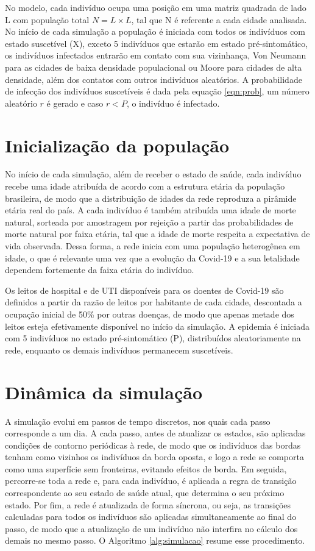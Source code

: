 \documentclass[
	12pt,				%
	openright,			%
	oneside,			%
	a4paper,			%
	english,			%
	french,				%
	spanish,			%
	brazil				%
	]{abntex2}
\begin{document}
No modelo, cada indivíduo ocupa uma posição em uma matriz quadrada de lado L com população total $N = L \times L$, tal que N é referente a cada cidade analisada. No início de cada simulação a população é iniciada com todos os indivíduos com estado suscetível (X), exceto 5 indivíduos que estarão em estado pré-sintomático, os indivíduos infectados entrarão em contato com sua vizinhança, Von Neumann para as cidades de baixa densidade populacional ou Moore para cidades de alta densidade, além dos contatos com outros indivíduos aleatórios. A probabilidade de infecção dos indivíduos suscetíveis é dada pela equação \ref{eqn:prob}, um número aleatório $r$ é gerado e caso $r < P$, o indivíduo é infectado.

\section{Inicialização da população}

No início de cada simulação, além de receber o estado de saúde, cada indivíduo recebe uma idade atribuída de acordo com a estrutura etária da população brasileira, de modo que a distribuição de idades da rede reproduza a pirâmide etária real do país. A cada indivíduo é também atribuída uma idade de morte natural, sorteada por amostragem por rejeição a partir das probabilidades de morte natural por faixa etária, tal que a idade de morte respeita a expectativa de vida observada. Dessa forma, a rede inicia com uma população heterogênea em idade, o que é relevante uma vez que a evolução da Covid-19 e a sua letalidade dependem fortemente da faixa etária do indivíduo.

Os leitos de hospital e de UTI disponíveis para os doentes de Covid-19 são definidos a partir da razão de leitos por habitante de cada cidade, descontada a ocupação inicial de 50\% por outras doenças, de modo que apenas metade dos leitos esteja efetivamente disponível no início da simulação. A epidemia é iniciada com 5 indivíduos no estado pré-sintomático (P), distribuídos aleatoriamente na rede, enquanto os demais indivíduos permanecem suscetíveis.

\section{Dinâmica da simulação}

A simulação evolui em passos de tempo discretos, nos quais cada passo corresponde a um dia. A cada passo, antes de atualizar os estados, são aplicadas condições de contorno periódicas à rede, de modo que os indivíduos das bordas tenham como vizinhos os indivíduos da borda oposta, e logo a rede se comporta como uma superfície sem fronteiras, evitando efeitos de borda. Em seguida, percorre-se toda a rede e, para cada indivíduo, é aplicada a regra de transição correspondente ao seu estado de saúde atual, que determina o seu próximo estado. Por fim, a rede é atualizada de forma síncrona, ou seja, as transições calculadas para todos os indivíduos são aplicadas simultaneamente ao final do passo, de modo que a atualização de um indivíduo não interfira no cálculo dos demais no mesmo passo. O Algoritmo \ref{alg:simulacao} resume esse procedimento.
\end{document}
